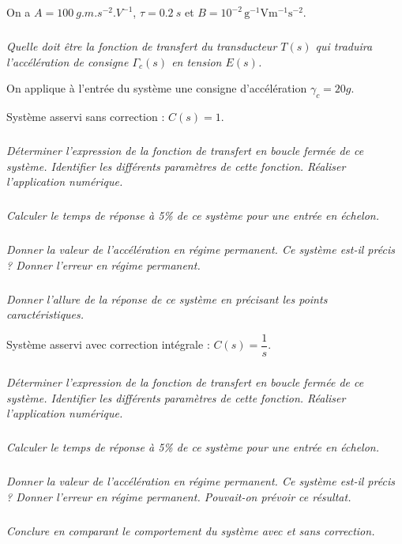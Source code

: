 \documentclass[10pt,fleqn]{article} %
\begin{document}
\begin{multicols}{2}
On a $A=\SI{100}{g.m.s^{-2}.V^{-1}}$, $\tau=\SI{0,2}{s}$ et $B=10^{-2}\,\text{g}^{-1}\text{V}\text{m}^{-1}\text{s}^{-2}$.

\subparagraph{}\textit{Quelle doit être la fonction de transfert du transducteur $T(s)$ qui traduira l’accélération de consigne $\Gamma_c(s)$ en tension $E(s)$.}

On applique à l’entrée du système une consigne d’accélération $\gamma_c=20 g$.

Système asservi sans correction : $C(s)=1$.
\subparagraph{}\textit{Déterminer l'expression de la fonction de transfert en boucle fermée de ce système. Identifier les différents paramètres de cette fonction. Réaliser l'application numérique.}

\subparagraph{}\textit{Calculer le temps de réponse à 5\% de ce système pour une entrée en échelon.}

\subparagraph{}\textit{Donner la valeur de l'accélération en régime permanent. Ce système est-il précis ? Donner l'erreur en régime permanent.}

\subparagraph{}\textit{Donner l'allure de la réponse de ce système en précisant les points caractéristiques.}

Système asservi avec correction intégrale : $C(s)=\dfrac{1}{s}$.

\subparagraph{}\textit{Déterminer l'expression de la fonction de transfert en boucle fermée de ce système. Identifier les
différents paramètres de cette fonction. Réaliser l'application numérique.}

\subparagraph{}\textit{Calculer le temps de réponse à 5\% de ce système pour une entrée en échelon.}

\subparagraph{}\textit{Donner la valeur de l'accélération en régime permanent. Ce système est-il précis ? Donner l'erreur en
régime permanent. Pouvait-on prévoir ce résultat.}

\subparagraph{}\textit{Conclure en comparant le comportement du système avec et sans correction.}


\end{multicols}
\end{document}
